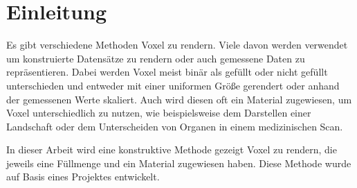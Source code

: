 
\section{Einleitung}
\label{sec:einleitung}
Es gibt verschiedene Methoden Voxel zu rendern. Viele davon werden verwendet um konstruierte Datensätze zu rendern oder auch gemessene Daten zu repräsentieren. Dabei werden Voxel meist binär als gefüllt oder nicht gefüllt unterschieden und entweder mit einer uniformen Größe gerendert oder anhand der gemessenen Werte skaliert. Auch wird diesen oft ein Material zugewiesen, um Voxel unterschiedlich zu nutzen, wie beispielsweise dem Darstellen einer Landschaft oder dem Unterscheiden von Organen in einem medizinischen Scan.

In dieser Arbeit wird eine konstruktive Methode gezeigt Voxel zu rendern, die jeweils eine Füllmenge und ein Material zugewiesen haben. Diese Methode wurde auf Basis eines Projektes entwickelt. \cite{project}